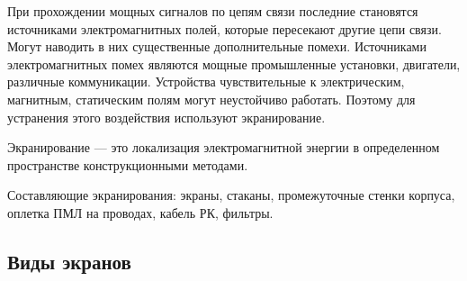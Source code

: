 \documentclass[unicode, 12pt, a4paper, oneside]{article}
\begin{document}
При прохождении мощных сигналов по цепям связи последние становятся источниками электромагнитных полей, которые пересекают другие цепи связи. Могут наводить в них существенные дополнительные помехи. Источниками электромагнитных помех являются мощные промышленные установки, двигатели, различные коммуникации. Устройства чувствительные к электрическим, магнитным, статическим полям могут неустойчиво работать. Поэтому для устранения этого воздействия используют экранирование.

Экранирование --- это локализация электромагнитной энергии в определенном пространстве конструкционными методами.

Составляющие экранирования: экраны, стаканы, промежуточные стенки корпуса, оплетка ПМЛ на проводах, кабель РК, фильтры.

\subsection*{Виды экранов}
\end{document}
